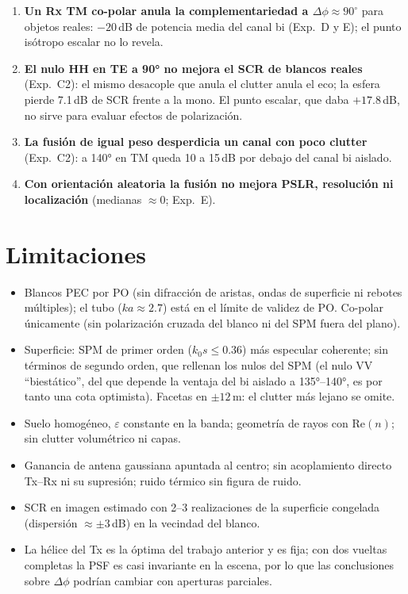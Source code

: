 \begin{enumerate}[itemsep=3pt]
  \item \textbf{Un Rx TM co-polar anula la complementariedad a $\Delta\phi\approx90^{\circ}$}
  para objetos reales: $-20$\,dB de potencia media del canal bi (Exp.~D y E); el punto
  isótropo escalar no lo revela.
  \item \textbf{El nulo HH en TE a 90° no mejora el SCR de blancos reales} (Exp.~C2): el mismo
  desacople que anula el clutter anula el eco; la esfera pierde 7.1\,dB de SCR frente a la mono.
  El punto escalar, que daba $+17.8$\,dB, no sirve para evaluar efectos de polarización.
  \item \textbf{La fusión de igual peso desperdicia un canal con poco clutter} (Exp.~C2): a 140°
  en TM queda 10 a 15\,dB por debajo del canal bi aislado.
  \item \textbf{Con orientación aleatoria la fusión no mejora PSLR, resolución ni
  localización} (medianas $\approx0$; Exp.~E).
\end{enumerate}

\chapter{Limitaciones}
\label{cap:limitaciones}

\begin{itemize}[itemsep=2pt]
  \item Blancos PEC por PO (sin difracción de aristas, ondas de superficie ni
  rebotes múltiples); el tubo ($ka\approx2.7$) está en el límite de validez de PO.
  Co-polar únicamente (sin polarización cruzada del blanco ni del SPM fuera del plano).
  \item Superficie: SPM de primer orden ($k_0s\le0.36$) más especular coherente;
  sin términos de segundo orden, que rellenan los nulos del SPM (el nulo VV
  ``biestático'', del que depende la ventaja del bi aislado a 135°--140°, es por tanto una cota
  optimista). Facetas
  en $\pm12$\,m: el clutter más lejano se omite.
  \item Suelo homogéneo, $\varepsilon$ constante en la banda; geometría de rayos con
  $\mathrm{Re}(n)$; sin clutter volumétrico ni capas.
  \item Ganancia de antena gaussiana apuntada al centro; sin acoplamiento directo
  Tx--Rx ni su supresión; ruido térmico sin figura de ruido.
  \item SCR en imagen estimado con 2--3 realizaciones de la superficie congelada
  (dispersión $\approx\pm3$\,dB) en la vecindad del blanco.
  \item La hélice del Tx es la óptima del trabajo anterior y es fija; con dos vueltas
  completas la PSF es casi invariante en la escena, por lo que las conclusiones sobre
  $\Delta\phi$ podrían cambiar con aperturas parciales.
\end{itemize}


